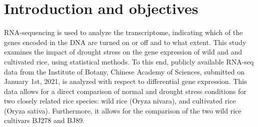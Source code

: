 \section{Introduction and objectives}

RNA-sequencing is used to analyze the transcriptome, indicating which of the genes encoded in the DNA are turned on or off and to what extent. This study examines the impact of drought stress on the gene expression of wild and and cultivated rice, using statistical methods. To this end, publicly available RNA-seq data from the Institute of Botany, Chinese Academy of Sciences, submitted on January 1st, 2021, is analyzed with respect to differential gene expression. This data allows for a direct comparison of normal and drought stress conditions for two closely related rice species: wild rice (Oryza nivara), and cultivated rice (Oryza sativa). Furthermore, it allows for the comparison of the two wild rice cultivars BJ278 and BJ89.